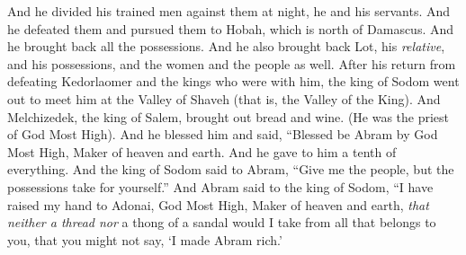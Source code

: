 \begin{biblechapter}
\verse And he divided his trained men against them at night, he and his servants. And he defeated them and pursued them to Hobah, which is north of Damascus.
\verse And he brought back all the possessions. And he also brought back Lot, his \textit{relative}, and his possessions, and the women and the people as well.
 After his return from defeating Kedorlaomer and the kings who were with him, the king of Sodom went out to meet him at the Valley of Shaveh (that is, the Valley of the King).
\verse And Melchizedek, the king of Salem, brought out bread and wine. (He was the priest of God Most High).
\verse And he blessed him and said,
\verse “Blessed be Abram by God Most High, 
Maker of heaven and earth.
\verse And he gave to him a tenth of everything.
\verse And the king of Sodom said to Abram, “Give me the people, but the possessions take for yourself.”
\verse And Abram said to the king of Sodom, “I have raised my hand to Adonai, God Most High, Maker of heaven and earth,
\verse \textit{that neither a thread nor} a thong of a sandal would I take from all that belongs to you, that you might not say, ‘I made Abram rich.’
\end{biblechapter}

